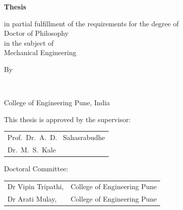 \begin{titlepage}
\begin{center}
{\Large\titlefont\bfseries Thesis}

\bigskip
\bigskip

in partial fulfillment of the requirements for the degree of\\
Doctor of Philosophy\\
in the subject of \\
\bigskip
Mechanical Engineering



%
%

\bigskip
\bigskip

By

\bigskip
\bigskip

\makeatletter
{\Large\titlefont\bfseries\@firstname\ {\titleshape\@lastname}}
\makeatother

\bigskip
\bigskip

College of Engineering Pune, India


\vspace*{2\bigskipamount}

\end{center}

\clearpage
\thispagestyle{empty}

\noindent This thesis is approved by the supervisor:

\medskip\noindent
\begin{tabular}{l}
Prof.\ Dr.\ A.\ D. \ Sahasrabudhe\\
Dr.\ M.\ S.\ Kale\\
\end{tabular}
%

\medskip
\noindent Doctoral Committee:

\medskip\noindent
\begin{tabular}{ll}
    Dr Vipin Tripathi, & College of Engineering Pune \\
     Dr Arati Mulay, & College of Engineering Pune
\end{tabular}


\end{titlepage}
